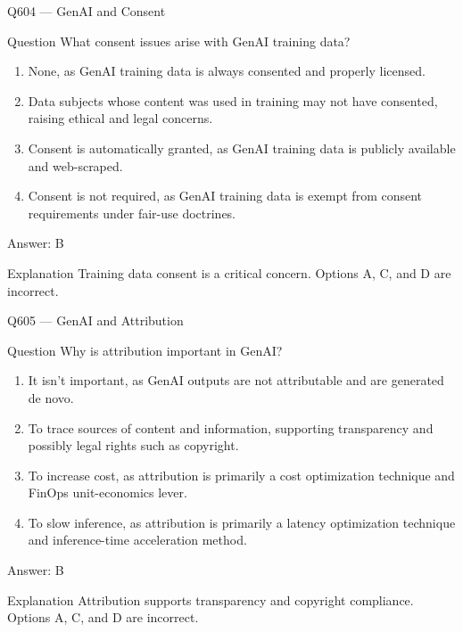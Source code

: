 \documentclass[aspectratio=169,8pt]{beamer}
\begin{document}
	\begin{frame}{Q604 --- GenAI and Consent}
		\begin{block}{Question}
			What consent issues arise with GenAI training data?
			\begin{enumerate}
				\item None, as GenAI training data is always consented and properly licensed.
				\item Data subjects whose content was used in training may not have consented, raising ethical and legal concerns.
				\item Consent is automatically granted, as GenAI training data is publicly available and web-scraped.
				\item Consent is not required, as GenAI training data is exempt from consent requirements under fair-use doctrines.
			\end{enumerate}
		\end{block}
		\begin{exampleblock}{Answer: B}\end{exampleblock}
		\begin{block}{Explanation}
			Training data consent is a critical concern. Options A, C, and D are incorrect.
		\end{block}
	\end{frame}
	
	\begin{frame}{Q605 --- GenAI and Attribution}
		\begin{block}{Question}
			Why is attribution important in GenAI?
			\begin{enumerate}
				\item It isn't important, as GenAI outputs are not attributable and are generated de novo.
				\item To trace sources of content and information, supporting transparency and possibly legal rights such as copyright.
				\item To increase cost, as attribution is primarily a cost optimization technique and FinOps unit-economics lever.
				\item To slow inference, as attribution is primarily a latency optimization technique and inference-time acceleration method.
			\end{enumerate}
		\end{block}
		\begin{exampleblock}{Answer: B}\end{exampleblock}
		\begin{block}{Explanation}
			Attribution supports transparency and copyright compliance. Options A, C, and D are incorrect.
		\end{block}
	\end{frame}
	
\end{document}
